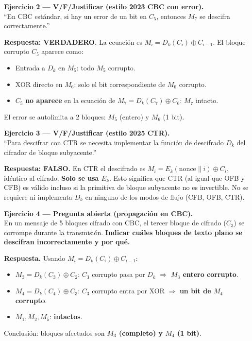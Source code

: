 \documentclass[11pt,a4paper]{article}
\begin{document}
\begin{examen}
\textbf{Ejercicio 2 --- V/F/Justificar (estilo 2023 CBC con error).}\\
``En CBC est\'andar, si hay un error de un bit en $C_5$, entonces $M_7$ se
descifra correctamente.''

\medskip
\textbf{Respuesta: VERDADERO.} La ecuaci\'on es $M_i = D_k(C_i)\oplus
C_{i-1}$. El bloque corrupto $C_5$ aparece como:
\begin{itemize}[nosep]
  \item Entrada a $D_k$ en $M_5$: todo $M_5$ corrupto.
  \item XOR directo en $M_6$: solo el bit correspondiente de $M_6$ corrupto.
  \item $C_5$ \textbf{no aparece} en la ecuaci\'on de $M_7 = D_k(C_7)\oplus
    C_6$: $M_7$ intacto.
\end{itemize}
El error se autolimita a 2 bloques: $M_5$ (entero) y $M_6$ (1 bit).
\end{examen}

\begin{examen}
\textbf{Ejercicio 3 --- V/F/Justificar (estilo 2025 CTR).}\\
``Para descifrar con CTR se necesita implementar la funci\'on de descifrado
$D_k$ del cifrador de bloque subyacente.''

\medskip
\textbf{Respuesta: FALSO.} En CTR el descifrado es
$M_i = E_k(\mathrm{nonce}\|i)\oplus C_i$, id\'entico al cifrado. \textbf{Solo
se usa $E_k$}. Esto significa que CTR (al igual que OFB y CFB) es v\'alido
incluso si la primitiva de bloque subyacente no es invertible. No se requiere
ni implementa $D_k$ en ninguno de los modos de flujo (CFB, OFB, CTR).
\end{examen}

\begin{examen}
\textbf{Ejercicio 4 --- Pregunta abierta (propagaci\'on en CBC).}\\
En un mensaje de 5 bloques cifrado con CBC, el tercer bloque de cifrado
($C_3$) se corrompe durante la transmisi\'on. \textbf{Indicar cu\'ales bloques
de texto plano se descifran incorrectamente y por qu\'e.}

\medskip
\textbf{Respuesta.} Usando $M_i = D_k(C_i)\oplus C_{i-1}$:
\begin{itemize}[nosep]
  \item $M_3 = D_k(C_3)\oplus C_2$: $C_3$ corrupto pasa por $D_k$
    $\Rightarrow$ \textbf{$M_3$ entero corrupto}.
  \item $M_4 = D_k(C_4)\oplus C_3$: $C_3$ corrupto entra por XOR
    $\Rightarrow$ \textbf{un bit de $M_4$ corrupto}.
  \item $M_1, M_2, M_5$: \textbf{intactos}.
\end{itemize}
Conclusi\'on: bloques afectados son \textbf{$M_3$ (completo) y $M_4$ (1 bit)}.
\end{examen}
\end{document}
